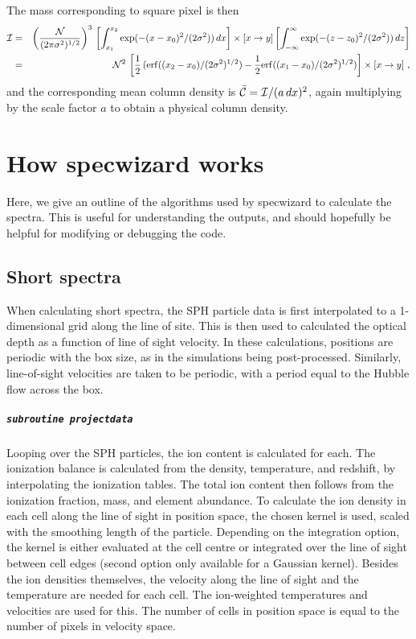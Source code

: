 \documentclass{report}
\begin{document}
The mass corresponding to square pixel is then
\begin{eqnarray}
{\cal I} &=& \left({{\cal N}\over (2\pi\sigma^2)^{1/2}}\right)^3\,\left[\int_{x_1}^{x_2}\exp(-(x-x_0)^2/(2\sigma^2))\,dx\right]\times\left[x\rightarrow y\right]\left[\int_{-\infty}^\infty \exp(-(z-z_0)^2/(2\sigma^2))\,dz\right]\nonumber\\
&=&{\cal N}^2\,\left[{1\over 2}\,({\rm erf}((x_2-x_0)/(2\sigma^2)^{1/2})-{1\over 2}{\rm erf}((x_1-x_0)/(2\sigma^2)^{1/2})\right]\times\left[x\rightarrow y\right]\,,
\end{eqnarray}
and the corresponding mean column density is $\bar{\cal C}={\cal I}/(a\,dx)^2$, again multiplying by the scale factor $a$ to obtain a physical column density.



\chapter{How specwizard works}
Here, we give an outline of the algorithms used by specwizard to calculate the spectra. This is useful for understanding the outputs, and should hopefully be helpful for modifying or debugging the code.

\section{Short spectra}
When calculating short spectra, the SPH particle data is first interpolated to a 1-dimensional grid along the line of site. This is then used to calculated the optical depth as a function of line of sight velocity. In these calculations, positions are periodic with the box size, as in the simulations being post-processed. Similarly, line-of-sight velocities are taken to be periodic, with a period equal to the Hubble flow across the box.

\paragraph{{\tt subroutine projectdata}}
Looping over the SPH particles, the ion content is calculated for each. The ionization balance is calculated from the density, temperature, and redshift, by interpolating the ionization tables. The total ion content then follows from the ionization fraction, mass, and element abundance. To calculate the ion density in each cell along the line of sight in position space, the chosen kernel is used, scaled with the smoothing length of the particle. Depending on the integration option, the kernel is either evaluated at the cell centre or integrated over the line of sight between cell edges (second option only available for a Gaussian kernel). Besides the ion densities themselves, the velocity along the line of sight and the temperature are needed for each cell. The ion-weighted temperatures and velocities are used for this. The number of cells in position space is equal to the number of pixels in velocity space.
\end{document}
